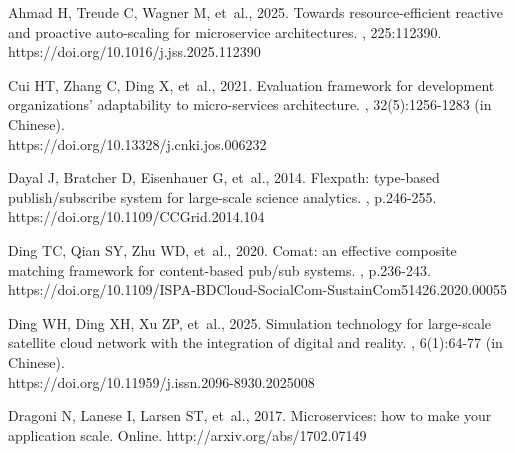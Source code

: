 \begin{thebibliography}{}\footnotesize
\itemsep -4pt
\vspace{-8pt}

Ahmad H, Treude C, Wagner M, {et~al.}, 2025.
\newblock Towards resource-efficient reactive and proactive auto-scaling for microservice architectures.
, 225:112390. \\
https://doi.org/10.1016/j.jss.2025.112390

Cui HT, Zhang C, Ding X, {et~al.}, 2021.
\newblock Evaluation framework for development organizations' adaptability to micro-services architecture.
, 32(5):1256-1283 (in Chinese). \\
https://doi.org/10.13328/j.cnki.jos.006232

Dayal J, Bratcher D, Eisenhauer G, {et~al.}, 2014.
\newblock Flexpath: type-based publish/subscribe system for large-scale science analytics.
, p.246-255. \\
https://doi.org/10.1109/CCGrid.2014.104

Ding TC, Qian SY, Zhu WD, {et~al.}, 2020.
\newblock Comat: an effective composite matching framework for content-based pub/sub systems.
, p.236-243. \\
https://doi.org/10.1109/ISPA-BDCloud-SocialCom-SustainCom51426.2020.00055

Ding WH, Ding XH, Xu ZP, {et~al.}, 2025.
\newblock Simulation technology for large-scale satellite cloud network with the integration of digital and reality.
, 6(1):64-77 (in Chinese). \\
https://doi.org/10.11959/j.issn.2096-8930.2025008

Dragoni N, Lanese I, Larsen ST, {et~al.}, 2017.
\newblock Microservices: how to make your application scale.
\newblock Online. http://arxiv.org/abs/1702.07149


\end{thebibliography}
